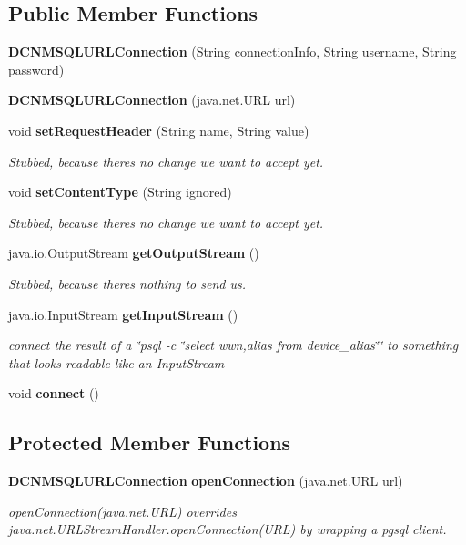 \subsection*{Public Member Functions}
\begin{DoxyCompactItemize}
\item 
{\bf D\+C\+N\+M\+S\+Q\+L\+U\+R\+L\+Connection} (String connection\+Info, String username, String password)
\item 
{\bf D\+C\+N\+M\+S\+Q\+L\+U\+R\+L\+Connection} (java.\+net.\+U\+R\+L url)
\item 
void {\bf set\+Request\+Header} (String name, String value)
\begin{DoxyCompactList}\small\item\em Stubbed, because there\textquotesingle{}s no change we want to accept yet. \end{DoxyCompactList}\item 
void {\bf set\+Content\+Type} (String ignored)
\begin{DoxyCompactList}\small\item\em Stubbed, because there\textquotesingle{}s no change we want to accept yet. \end{DoxyCompactList}\item 
java.\+io.\+Output\+Stream {\bf get\+Output\+Stream} ()
\begin{DoxyCompactList}\small\item\em Stubbed, because there\textquotesingle{}s nothing to send us. \end{DoxyCompactList}\item 
java.\+io.\+Input\+Stream {\bf get\+Input\+Stream} ()
\begin{DoxyCompactList}\small\item\em connect the result of a \char`\"{}psql -\/c \char`\"{}select wwn,alias from device\+\_\+alias\char`\"{}\char`\"{} to something that looks readable like an Input\+Stream \end{DoxyCompactList}\item 
void {\bf connect} ()
\end{DoxyCompactItemize}
\subsection*{Protected Member Functions}
\begin{DoxyCompactItemize}
\item 
{\bf D\+C\+N\+M\+S\+Q\+L\+U\+R\+L\+Connection} {\bf open\+Connection} (java.\+net.\+U\+R\+L url)
\begin{DoxyCompactList}\small\item\em open\+Connection(java.\+net.\+U\+R\+L) overrides java.\+net.\+U\+R\+L\+Stream\+Handler.\+open\+Connection(\+U\+R\+L) by wrapping a pgsql client. \end{DoxyCompactList}\end{DoxyCompactItemize}


